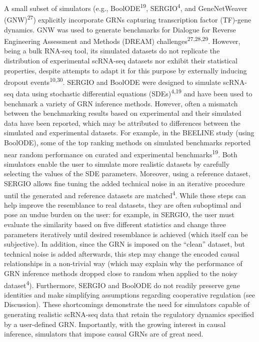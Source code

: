 A small subset of simulators (e.g., BoolODE\textsuperscript{19}, SERGIO\textsuperscript{4}, and GeneNetWeaver (GNW)\textsuperscript{27}) explicitly incorporate GRNs capturing transcription factor (TF)-gene dynamics. GNW was used to generate benchmarks for Dialogue for Reverse Engineering Assessment and Methods (DREAM) challenges\textsuperscript{27,28,29}. However, being a bulk RNA-seq tool, its simulated datasets do not replicate the distribution of experimental scRNA-seq datasets nor exhibit their statistical properties, despite attempts to adapt it for this purpose by externally inducing dropout events\textsuperscript{10,30}. SERGIO and BoolODE were designed to simulate scRNA-seq data using stochastic differential equations (SDEs)\textsuperscript{4,19} and have been used to benchmark a variety of GRN inference methods. However, often a mismatch between the benchmarking results based on experimental and their simulated data have been reported, which may be attributed to differences between the simulated and experimental datasets. For example, in the BEELINE study (using BoolODE), some of the top ranking methods on simulated benchmarks reported near random performance on curated and experimental benchmarks\textsuperscript{19}. Both simulators enable the user to simulate more realistic datasets by carefully selecting the values of the SDE parameters. Moreover, using a reference dataset, SERGIO allows fine tuning the added technical noise in an iterative procedure until the generated and reference datasets are matched\textsuperscript{4}. While these steps can help improve the resemblance to real datasets, they are often suboptimal and pose an undue burden on the user: for example, in SERGIO, the user must evaluate the similarity based on five different statistics and change three parameters iteratively until desired resemblance is achieved (which itself can be subjective). In addition, since the GRN is imposed on the “clean” dataset, but technical noise is added afterwards, this step may change the encoded causal relationships in a non-trivial way (which may explain why the performance of GRN inference methods dropped close to random when applied to the noisy dataset\textsuperscript{4}). Furthermore, SERGIO and BoolODE do not readily preserve gene identities and make simplifying assumptions regarding cooperative regulation (see Discussion). These shortcomings demonstrate the need for simulators capable of generating realistic scRNA-seq data that retain the regulatory dynamics specified by a user-defined GRN. Importantly, with the growing interest in causal inference, simulators that impose causal GRNs are of great need.

